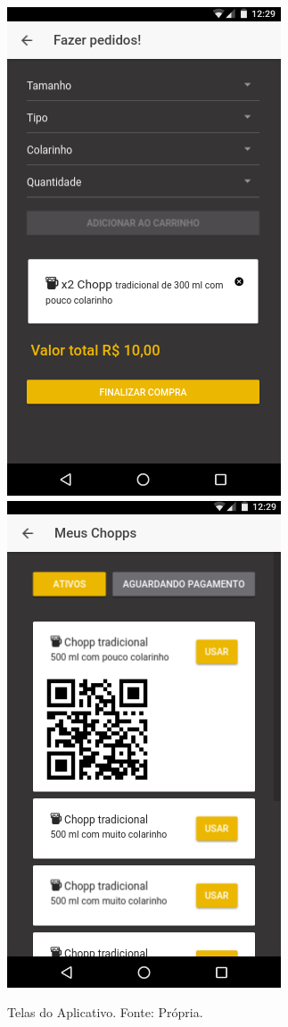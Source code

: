 \begin{figure}[!htb]
    \includegraphics[scale= 0.3]{figuras/Aplicativo/compra.png}        
    \includegraphics[scale= 0.3]{figuras/Aplicativo/chopps.png}        
    \caption{Telas do Aplicativo. Fonte: Própria.}    
    \label{home-page}
\end{figure}

